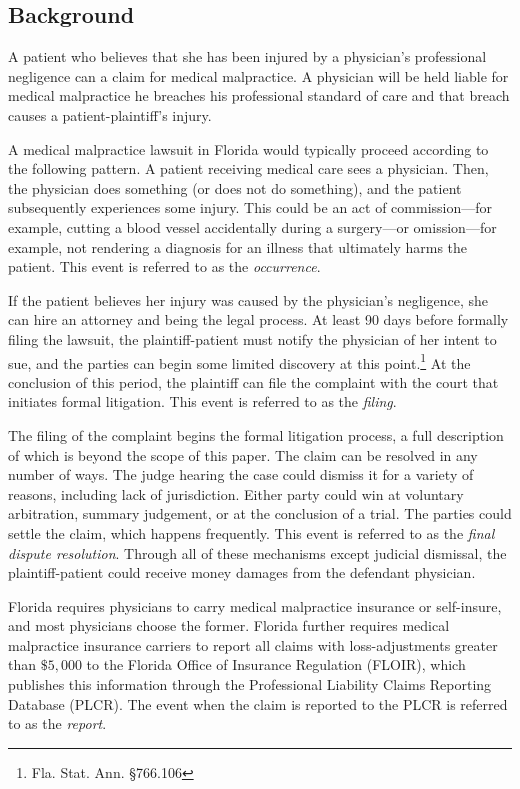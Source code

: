 \documentclass[
  12pt,
]{article}
\begin{document}
\hypertarget{background}{%
\subsection{Background}\label{background}}

A patient who believes that she has been injured by a physician's professional negligence can a claim for medical malpractice. A physician will be held liable for medical malpractice he breaches his professional standard of care and that breach causes a patient-plaintiff's injury.

A medical malpractice lawsuit in Florida would typically proceed according to the following pattern. A patient receiving medical care sees a physician. Then, the physician does something (or does not do something), and the patient subsequently experiences some injury. This could be an act of commission---for example, cutting a blood vessel accidentally during a surgery---or omission---for example, not rendering a diagnosis for an illness that ultimately harms the patient. This event is referred to as the \emph{occurrence}.

If the patient believes her injury was caused by the physician's negligence, she can hire an attorney and being the legal process. At least 90 days before formally filing the lawsuit, the plaintiff-patient must notify the physician of her intent to sue, and the parties can begin some limited discovery at this point.\footnote{Fla. Stat. Ann. \S 766.106} At the conclusion of this period, the plaintiff can file the complaint with the court that initiates formal litigation. This event is referred to as the \emph{filing}.

The filing of the complaint begins the formal litigation process, a full description of which is beyond the scope of this paper. The claim can be resolved in any number of ways. The judge hearing the case could dismiss it for a variety of reasons, including lack of jurisdiction. Either party could win at voluntary arbitration, summary judgement, or at the conclusion of a trial. The parties could settle the claim, which happens frequently. This event is referred to as the \emph{final dispute resolution}. Through all of these mechanisms except judicial dismissal, the plaintiff-patient could receive money damages from the defendant physician.

Florida requires physicians to carry medical malpractice insurance or self-insure, and most physicians choose the former. Florida further requires medical malpractice insurance carriers to report all claims with loss-adjustments greater than \(\$5,000\) to the Florida Office of Insurance Regulation (FLOIR), which publishes this information through the Professional Liability Claims Reporting Database (PLCR). The event when the claim is reported to the PLCR is referred to as the \emph{report}.
\end{document}
